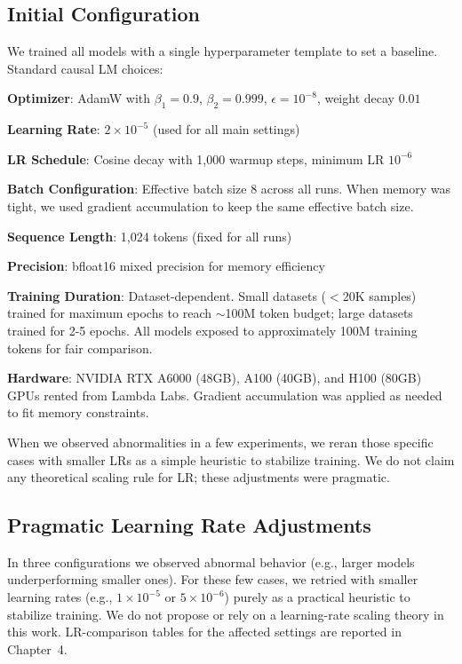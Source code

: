 \subsection{Initial Configuration}

We trained all models with a single hyperparameter template to set a baseline. Standard causal LM choices:

\textbf{Optimizer}: AdamW with $\beta_1=0.9$, $\beta_2=0.999$, $\epsilon=10^{-8}$, weight decay $0.01$

\textbf{Learning Rate}: $2 \times 10^{-5}$ (used for all main settings)

\textbf{LR Schedule}: Cosine decay with 1,000 warmup steps, minimum LR $10^{-6}$

\textbf{Batch Configuration}: Effective batch size 8 across all runs. When memory was tight, we used gradient accumulation to keep the same effective batch size.

\textbf{Sequence Length}: 1,024 tokens (fixed for all runs)

\textbf{Precision}: bfloat16 mixed precision for memory efficiency

\textbf{Training Duration}: Dataset-dependent. Small datasets ($<$20K samples) trained for maximum epochs to reach $\sim$100M token budget; large datasets trained for 2-5 epochs. All models exposed to approximately 100M training tokens for fair comparison.

\textbf{Hardware}: NVIDIA RTX A6000 (48GB), A100 (40GB), and H100 (80GB) GPUs rented from Lambda Labs. Gradient accumulation was applied as needed to fit memory constraints.

When we observed abnormalities in a few experiments, we reran those specific cases with smaller LRs as a simple heuristic to stabilize training. We do not claim any theoretical scaling rule for LR; these adjustments were pragmatic.

\subsection{Pragmatic Learning Rate Adjustments}

In three configurations we observed abnormal behavior (e.g., larger models underperforming smaller ones). For these few cases, we retried with smaller learning rates (e.g., $1\times 10^{-5}$ or $5\times 10^{-6}$) purely as a practical heuristic to stabilize training. We do not propose or rely on a learning-rate scaling theory in this work. LR-comparison tables for the affected settings are reported in Chapter~4.

